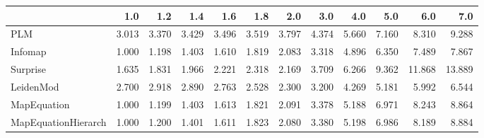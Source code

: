 \begin{tabular}{lrrrrrrrrrrr}
\toprule
{} &   1.0 &   1.2 &   1.4 &   1.6 &   1.8 &   2.0 &   3.0 &   4.0 &   5.0 &    6.0 &    7.0 \\
\midrule
PLM                 & 3.013 & 3.370 & 3.429 & 3.496 & 3.519 & 3.797 & 4.374 & 5.660 & 7.160 &  8.310 &  9.288 \\
Infomap             & 1.000 & 1.198 & 1.403 & 1.610 & 1.819 & 2.083 & 3.318 & 4.896 & 6.350 &  7.489 &  7.867 \\
Surprise            & 1.635 & 1.831 & 1.966 & 2.221 & 2.318 & 2.169 & 3.709 & 6.266 & 9.362 & 11.868 & 13.889 \\
LeidenMod           & 2.700 & 2.918 & 2.890 & 2.763 & 2.528 & 2.300 & 3.200 & 4.269 & 5.181 &  5.992 &  6.544 \\
MapEquation         & 1.000 & 1.199 & 1.403 & 1.613 & 1.821 & 2.091 & 3.378 & 5.188 & 6.971 &  8.243 &  8.864 \\
MapEquationHierarch & 1.000 & 1.200 & 1.401 & 1.611 & 1.823 & 2.080 & 3.380 & 5.198 & 6.986 &  8.189 &  8.884 \\
\bottomrule
\end{tabular}

